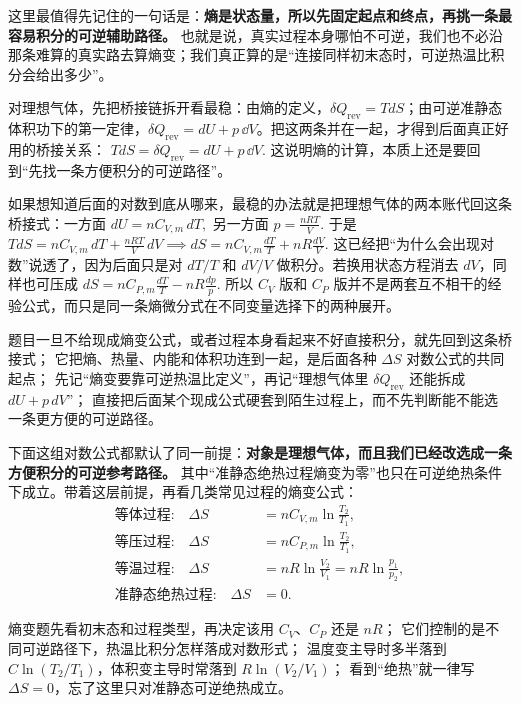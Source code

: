 \documentclass[lang=cn,11pt]{elegantbook}
\begin{document}
这里最值得先记住的一句话是：\textbf{熵是状态量，所以先固定起点和终点，再挑一条最容易积分的可逆辅助路径。} 也就是说，真实过程本身哪怕不可逆，我们也不必沿那条难算的真实路去算熵变；我们真正算的是“连接同样初末态时，可逆热温比积分会给出多少”。

对理想气体，先把桥接链拆开看最稳：由熵的定义，\(\delta Q_{\mathrm{rev}}=TdS\)；由可逆准静态体积功下的第一定律，\(\delta Q_{\mathrm{rev}}=dU+p\,\dd V\)。把这两条并在一起，才得到后面真正好用的桥接关系：
 \(TdS=\delta Q_{\mathrm{rev}}=dU+p\,\dd V.\) 
这说明熵的计算，本质上还是要回到“先找一条方便积分的可逆路径”。

如果想知道后面的对数到底从哪来，最稳的办法就是把理想气体的两本账代回这条桥接式：一方面
 \(dU=nC_{V,m}\,dT,\) 
另一方面
 \(p=\frac{nRT}{V}.\) 
于是
 \(TdS=nC_{V,m}\,dT+\frac{nRT}{V}\,dV \implies dS=nC_{V,m}\frac{dT}{T}+nR\frac{dV}{V}.\) 
这已经把“为什么会出现对数”说透了，因为后面只是对 \(dT/T\) 和 \(dV/V\) 做积分。若换用状态方程消去 \(dV\)，同样也可压成
 \(dS=nC_{P,m}\frac{dT}{T}-nR\frac{dp}{p}.\) 
所以 \(C_V\) 版和 \(C_P\) 版并不是两套互不相干的经验公式，而只是同一条熵微分式在不同变量选择下的两种展开。

\begin{note}
 题目一旦不给现成熵变公式，或者过程本身看起来不好直接积分，就先回到这条桥接式； 它把熵、热量、内能和体积功连到一起，是后面各种 \(\Delta S\) 对数公式的共同起点； 先记“熵变要靠可逆热温比定义”，再记“理想气体里 \(\delta Q_{\mathrm{rev}}\) 还能拆成 \(dU+p\,dV\)”； 直接把后面某个现成公式硬套到陌生过程上，而不先判断能不能选一条更方便的可逆路径。
\end{note}

下面这组对数公式都默认了同一前提：\textbf{对象是理想气体，而且我们已经改选成一条方便积分的可逆参考路径。} 其中“准静态绝热过程熵变为零”也只在可逆绝热条件下成立。带着这层前提，再看几类常见过程的熵变公式：
\begin{align*}
\text{等体过程:}\quad \Delta S&=nC_{V,m}\ln\frac{T_2}{T_1},\\
\text{等压过程:}\quad \Delta S&=nC_{P,m}\ln\frac{T_2}{T_1},\\
\text{等温过程:}\quad \Delta S&=nR\ln\frac{V_2}{V_1}=nR\ln\frac{p_1}{p_2},\\
\text{准静态绝热过程:}\quad \Delta S&=0.
\end{align*}

\begin{note}
 熵变题先看初末态和过程类型，再决定该用 \(C_V\)、\(C_P\) 还是 \(nR\)； 它们控制的是不同可逆路径下，热温比积分怎样落成对数形式； 温度变主导时多半落到 \(C\ln(T_2/T_1)\)，体积变主导时常落到 \(R\ln(V_2/V_1)\)； 看到“绝热”就一律写 \(\Delta S=0\)，忘了这里只对准静态可逆绝热成立。
\end{note}
\end{document}
